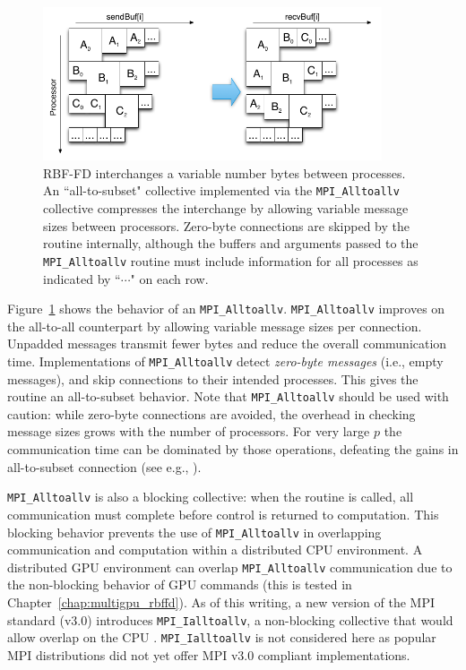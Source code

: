 \documentclass{report}
\begin{document}
\begin{figure}
\centering
\includegraphics[width=10cm]{../figures/omnigraffle/MPI_Alltoallv_Visual.png}
\caption{RBF-FD interchanges a variable number bytes between processes. An ``all-to-subset" collective implemented via the \texttt{MPI\_Alltoallv} collective compresses the interchange by allowing variable message sizes between processors. Zero-byte connections are skipped by the routine internally, although the buffers and arguments passed to the \texttt{MPI\_Alltoallv} routine must include information for all processes as indicated by ``$\cdots$" on each row.}
\label{fig:mpi_alltoallv_visual}
\end{figure}

Figure~\ref{fig:mpi_alltoallv_visual} shows the behavior of an \texttt{MPI\_Alltoallv}. \texttt{MPI\_Alltoallv} improves on the all-to-all counterpart by allowing variable message sizes per connection. Unpadded messages transmit fewer bytes and reduce the overall communication time. Implementations of \texttt{MPI\_Alltoallv} detect \emph{zero-byte messages} (i.e., empty messages), and skip connections to their intended processes. This gives the routine an all-to-subset behavior. Note that \texttt{MPI\_Alltoallv} should be used with caution: while zero-byte connections are avoided, the overhead in checking message sizes grows with the number of processors. For very large $p$ the communication time can be dominated by those operations, defeating the gains in all-to-subset connection (see e.g., \cite{Balaji2010}). 


%

\texttt{MPI\_Alltoallv} is also a blocking collective: when the routine is called, all communication must complete before control is returned to computation. This blocking behavior prevents the use of \texttt{MPI\_Alltoallv} in overlapping communication and computation within a distributed CPU environment. A distributed GPU environment can overlap \texttt{MPI\_Alltoallv} communication due to the non-blocking behavior of GPU commands (this is tested in Chapter~\ref{chap:multigpu_rbffd}). As of this writing, a new version of the MPI standard (v3.0) introduces \texttt{MPI\_Ialltoallv}, a non-blocking collective that would allow overlap on the CPU \cite{MPI}. \texttt{MPI\_Ialltoallv} is not considered here as popular MPI distributions did not yet offer MPI v3.0 compliant implementations.
\end{document}
